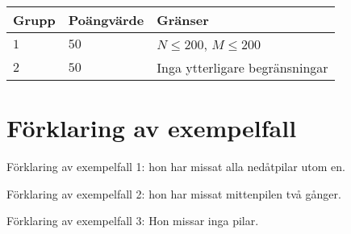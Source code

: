 \noindent
\begin{tabular}{| l | l | l |}
  \hline
  Grupp & Poängvärde & Gränser \\ \hline
  $1$   & $50$       & $N \leq 200$, $M \leq 200$ \\ \hline
  $2$   & $50$       & Inga ytterligare begränsningar \\ \hline
\end{tabular}

\section*{Förklaring av exempelfall}
Förklaring av exempelfall 1: hon har missat alla nedåtpilar utom en.

Förklaring av exempelfall 2: hon har missat mittenpilen två gånger.

Förklaring av exempelfall 3: Hon missar inga pilar.